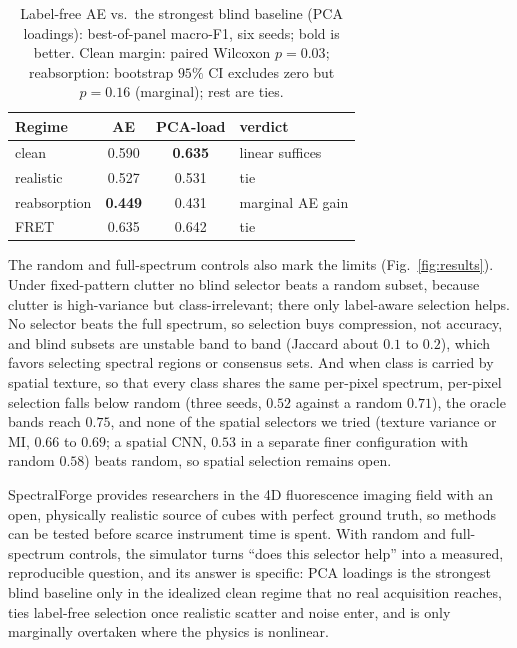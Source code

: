 \documentclass{article}
\makeatletter
\renewcommand\section{\@startsection{section}{1}{\z@}{9pt}{4pt}{\normalfont\bfseries}}
\makeatother
\begin{document}
\begin{table}[t]
\caption{Label-free AE vs.\ the strongest blind baseline (PCA loadings): best-of-panel macro-F1, six seeds; bold is better. Clean margin: paired Wilcoxon $p=0.03$; reabsorption: bootstrap $95\%$ CI excludes zero but $p=0.16$ (marginal); rest are ties.}
\label{tab:battery}
\centering
\renewcommand{\arraystretch}{1.2}
\begin{tabular*}{\columnwidth}{@{\extracolsep{\fill}}lccl@{}}
\toprule
Regime & AE & PCA-load & verdict \\
\midrule
clean & 0.590 & \textbf{0.635} & linear suffices \\
realistic & 0.527 & 0.531 & tie \\
reabsorption & \textbf{0.449} & 0.431 & marginal AE gain \\
FRET & 0.635 & 0.642 & tie \\
\bottomrule
\end{tabular*}
\end{table}


The random and full-spectrum controls also mark the limits (Fig.~\ref{fig:results}).
Under fixed-pattern clutter no blind selector beats a random subset, because clutter is
high-variance but class-irrelevant; there only label-aware selection helps. No selector
beats the full spectrum, so selection buys compression, not accuracy, and blind subsets
are unstable band to band (Jaccard about $0.1$ to $0.2$), which favors selecting spectral
regions or consensus sets. And when class is carried by spatial texture, so that every
class shares the same per-pixel spectrum, per-pixel selection falls below random (three seeds, $0.52$ against a random $0.71$), the oracle bands reach $0.75$, and none of the spatial selectors we tried
(texture variance or MI, $0.66$ to $0.69$; a spatial CNN, $0.53$ in a separate finer configuration with random $0.58$) beats random, so spatial selection remains open.

\section{Discussion and Conclusion}
SpectralForge provides researchers in the 4D fluorescence imaging field with an open, physically realistic source of cubes
with perfect ground truth, so methods can be tested before scarce instrument time is spent.
With random and full-spectrum controls, the simulator turns ``does this selector help'' into a measured, reproducible question, and its answer is specific: PCA loadings is the strongest blind
baseline only in the idealized clean regime that no real acquisition reaches, ties
label-free selection once realistic scatter and noise enter, and is only marginally overtaken where
the physics is nonlinear.
\end{document}

